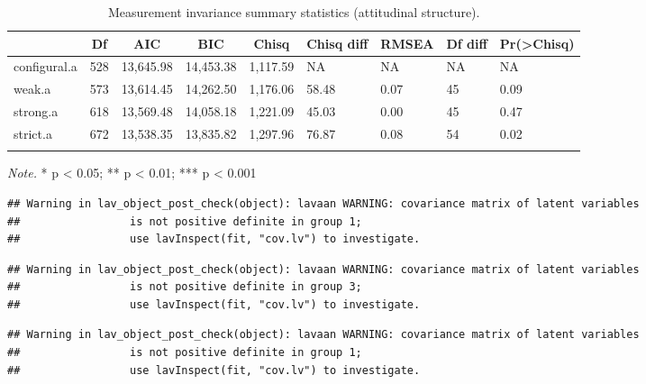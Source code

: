 \documentclass[
  man]{apa6}
\begin{document}
\begin{table}[tbp]

\begin{center}
\begin{threeparttable}

\caption{\label{tab:measinv.pilot.att}Measurement invariance summary statistics (attitudinal structure).}

\begin{tabular}{lllllllll}
\toprule
 & \multicolumn{1}{c}{Df} & \multicolumn{1}{c}{AIC} & \multicolumn{1}{c}{BIC} & \multicolumn{1}{c}{Chisq} & \multicolumn{1}{c}{Chisq diff} & \multicolumn{1}{c}{RMSEA} & \multicolumn{1}{c}{Df diff} & \multicolumn{1}{c}{Pr(>Chisq)}\\
\midrule
configural.a & 528 & 13,645.98 & 14,453.38 & 1,117.59 & NA & NA & NA & NA\\
weak.a & 573 & 13,614.45 & 14,262.50 & 1,176.06 & 58.48 & 0.07 & 45 & 0.09\\
strong.a & 618 & 13,569.48 & 14,058.18 & 1,221.09 & 45.03 & 0.00 & 45 & 0.47\\
strict.a & 672 & 13,538.35 & 13,835.82 & 1,297.96 & 76.87 & 0.08 & 54 & 0.02\\
\bottomrule
\addlinespace
\end{tabular}

\begin{tablenotes}[para]
\normalsize{\textit{Note.} * p < 0.05; ** p < 0.01; *** p < 0.001}
\end{tablenotes}

\end{threeparttable}
\end{center}

\end{table}

\begin{verbatim}
## Warning in lav_object_post_check(object): lavaan WARNING: covariance matrix of latent variables
##                 is not positive definite in group 1;
##                 use lavInspect(fit, "cov.lv") to investigate.
\end{verbatim}

\begin{verbatim}
## Warning in lav_object_post_check(object): lavaan WARNING: covariance matrix of latent variables
##                 is not positive definite in group 3;
##                 use lavInspect(fit, "cov.lv") to investigate.
\end{verbatim}

\begin{verbatim}
## Warning in lav_object_post_check(object): lavaan WARNING: covariance matrix of latent variables
##                 is not positive definite in group 1;
##                 use lavInspect(fit, "cov.lv") to investigate.
\end{verbatim}
\end{document}
